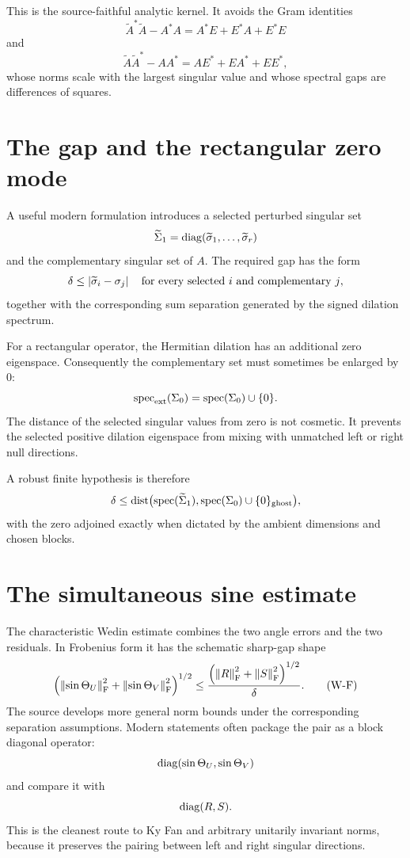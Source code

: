 This is the source-faithful analytic kernel. It avoids the Gram identities
\[
 \widetilde A^*\widetilde A-A^*A=A^*E+E^*A+E^*E
\]
and
\[
 \widetilde A\widetilde A^*-AA^*=AE^*+EA^*+EE^*,
\]
whose norms scale with the largest singular value and whose spectral gaps are differences of squares.

\section{The gap and the rectangular zero mode}

A useful modern formulation introduces a selected perturbed singular set
\[
 \widetilde\Sigma_1=\operatorname{diag}(\widetilde\sigma_1,\ldots,\widetilde\sigma_r)
\]
and the complementary singular set of $A$. The required gap has the form
\[
 \delta
 \le
 \left\lvert \widetilde\sigma_i-\sigma_j\right\rvert
 \quad\text{for every selected $i$ and complementary $j$},
\]
together with the corresponding sum separation generated by the signed dilation spectrum.

For a rectangular operator, the Hermitian dilation has an additional zero eigenspace. Consequently the complementary set must sometimes be enlarged by $0$:
\[
 \operatorname{spec}_{\mathrm{ext}}(\Sigma_0)
 =\operatorname{spec}(\Sigma_0)\cup\{0\}.
\]
The distance of the selected singular values from zero is not cosmetic. It prevents the selected positive dilation eigenspace from mixing with unmatched left or right null directions.

A robust finite hypothesis is therefore
\[
 \delta
 \le
 \operatorname{dist}\bigl(
   \operatorname{spec}(\widetilde\Sigma_1),
   \operatorname{spec}(\Sigma_0)\cup\{0\}_{\mathrm{ghost}}
 \bigr),
\]
with the zero adjoined exactly when dictated by the ambient dimensions and chosen blocks.

\section{The simultaneous sine estimate}

The characteristic Wedin estimate combines the two angle errors and the two residuals. In Frobenius form it has the schematic sharp-gap shape
\begin{equation}
 \left(
   \left\lVert \sin\Theta_U\right\rVert_{\mathrm{F}}^2
   +\left\lVert \sin\Theta_V\right\rVert_{\mathrm{F}}^2
 \right)^{1/2}
 \le
 \frac{
   \left(\left\lVert R\right\rVert_{\mathrm{F}}^2+\left\lVert S\right\rVert_{\mathrm{F}}^2\right)^{1/2}
 }{\delta}.
 \tag{W-F}
\end{equation}
The source develops more general norm bounds under the corresponding separation assumptions. Modern statements often package the pair as a block diagonal operator:
\[
 \operatorname{diag}(\sin\Theta_U,\sin\Theta_V)
\]
and compare it with
\[
 \operatorname{diag}(R,S).
\]
This is the cleanest route to Ky Fan and arbitrary unitarily invariant norms, because it preserves the pairing between left and right singular directions.

